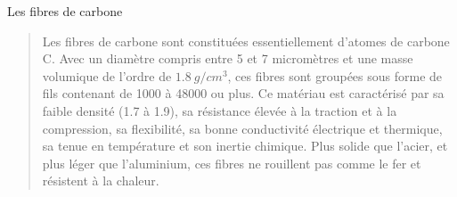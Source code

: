\begin{doc}
	\label{doc:carbone}
	\caption{Les fibres de carbone}
	
\begin{quotation}
		Les fibres de carbone sont constituées essentiellement d'atomes de carbone C. 
	Avec un diamètre compris entre 5 et 7 micromètres et une masse volumique de l'ordre de $\num{1.8} \: g/cm^3$, ces fibres sont groupées sous forme de fils contenant de \num{1000} à \num{48000} ou plus.
	Ce matériau est caractérisé par sa faible densité (\num{1.7} à \num{1.9}), sa résistance élevée à la traction et à la compression, sa flexibilité, sa bonne conductivité électrique et thermique, sa tenue en température et son inertie chimique.
	Plus solide que l'acier, et plus léger que l'aluminium, ces fibres ne rouillent pas comme le fer et résistent à la chaleur. 
\end{quotation}
\end{doc}